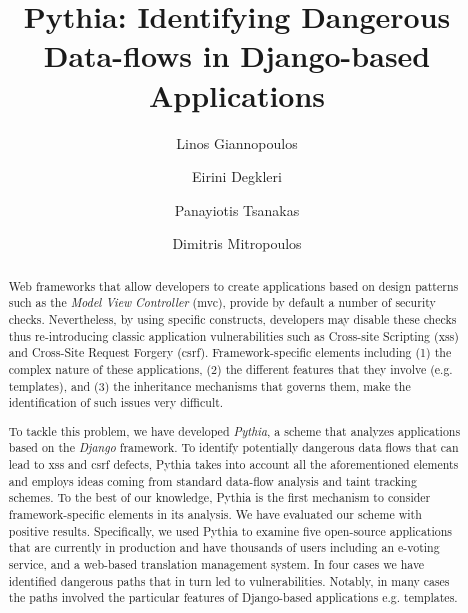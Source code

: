 \documentclass[sigconf]{acmart}
\begin{document}
\title{Pythia: Identifying Dangerous Data-flows in Django-based Applications}

\author{Linos Giannopoulos}

\author{Eirini Degkleri}

\author{Panayiotis Tsanakas}

\author{Dimitris Mitropoulos}

\renewcommand{\shortauthors}{L. Giannopoulos et al.}

\begin{abstract}
Web frameworks that allow developers
to create applications based on design
patterns such as the
{\it Model View Controller} ({\sc mvc}),
provide by default a number of security checks.
Nevertheless,
by using specific constructs,
developers may disable these checks
thus re-introducing classic application
vulnerabilities such as Cross-site Scripting
({\sc xss}) and Cross-Site Request Forgery
({\sc csrf}).
Framework-specific elements including
(1) the complex nature of these applications,
(2) the different features that they involve
(e.g. templates),
and (3) the inheritance mechanisms
that governs them,
make the identification
of such issues very difficult.

To tackle this problem,
we have developed {\it Pythia},
a scheme that analyzes applications
based on the {\it Django} framework.
To identify potentially dangerous
data flows that can lead to
{\sc xss} and {\sc csrf} defects,
Pythia takes into account all the
aforementioned elements and employs
ideas coming from standard
data-flow analysis and taint tracking schemes.
To the best of our knowledge,
Pythia is the first mechanism
to consider framework-specific
elements in its analysis.
We have evaluated our scheme
with positive results.
Specifically,
we used Pythia to examine five open-source
applications that are currently in production
and have thousands of users
including an e-voting service,
and a web-based translation
management system.
In four cases we have identified dangerous paths
that in turn led to vulnerabilities.
Notably,
in many cases the paths involved the
particular features of Django-based
applications e.g. templates.
\end{abstract}
\end{document}
